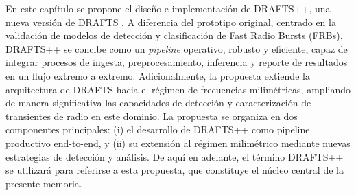 \setcounter{secnumdepth}{4}
\setcounter{tocdepth}{4}
\makeatletter
\renewcommand\paragraph{\@startsection{paragraph}{4}{\z@}%
  {1.5ex \@plus .5ex \@minus .2ex}%
  {0.8ex \@plus .2ex}%
  {\normalfont\normalsize\bfseries}}  %
\makeatother




En este capítulo se propone el diseño e implementación de DRAFTS++, una nueva versión de DRAFTS \cite{zhang2024drafts}. A diferencia del prototipo original, centrado en la validación de modelos de detección y clasificación de Fast Radio Bursts (FRBs), DRAFTS++ se concibe como un \textit{pipeline} operativo, robusto y eficiente, capaz de integrar procesos de ingesta, preprocesamiento, inferencia y reporte de resultados en un flujo extremo a extremo.
Adicionalmente, la propuesta extiende la arquitectura de DRAFTS hacia el régimen de frecuencias milimétricas, ampliando de manera significativa las capacidades de detección y caracterización de transientes de radio en este dominio.
La propuesta se organiza en dos componentes principales: (i) el desarrollo de DRAFTS++ como pipeline productivo end-to-end, y (ii) su extensión al régimen milimétrico mediante nuevas estrategias de detección y análisis. De aquí en adelante, el término DRAFTS++ se utilizará para referirse a esta propuesta, que constituye el núcleo central de la presente memoria.



